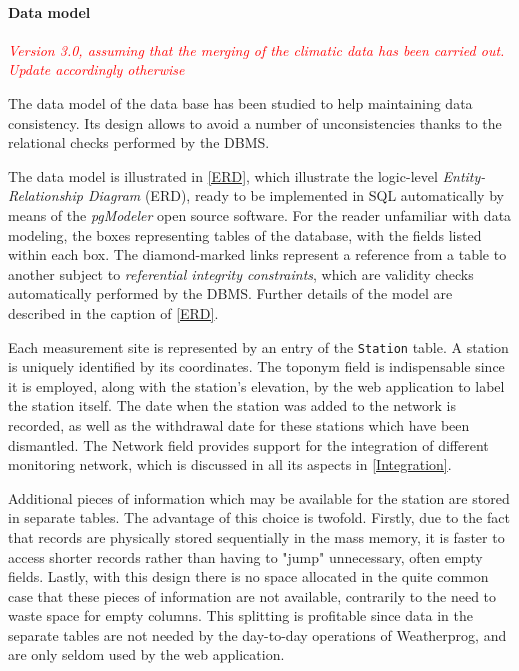\documentclass[authoryear,preprint,review,12pt]{elsarticle}
\newcommand{\note}[1]{\emph{\textcolor{red}{#1}}}
\begin{document}
\paragraph{Data model}
\note{Version 3.0, assuming that the merging of the climatic data has been carried out. Update accordingly otherwise}

The data model of the data base has been studied to help maintaining data consistency. Its design allows to avoid a number of unconsistencies thanks to the relational checks performed by the DBMS. 

The data model is illustrated in  \cref{ERD}, which illustrate the logic-level \emph{Entity-Relationship Diagram} (ERD), ready to be implemented in SQL automatically by means of the \emph{pgModeler} \citep{silva:pgmodeler} open source software. For the reader unfamiliar with data modeling, the boxes representing tables of the database, with the fields listed within each box. The diamond-marked links represent a reference from a table to another subject to \emph{referential integrity constraints}, which are validity checks automatically performed by the DBMS. Further details of the model are described in the caption of \cref{ERD}.

Each measurement site is represented by an entry of the \texttt{Station} table. A station is uniquely identified by its coordinates. The toponym field is indispensable since it is employed, along with the station's elevation, by the web application to label the station itself. The date when the station was added to the network is recorded, as well as the withdrawal date for these stations which have been dismantled. The Network field provides support for the integration of different monitoring network, which is discussed in all its aspects in \cref{Integration}.

Additional pieces of information which may be available for the station are stored in separate tables. The advantage of this choice is twofold. Firstly, due to the fact that records are physically stored sequentially in the mass memory,  it is faster to access shorter records rather than having to "jump" unnecessary, often empty fields. Lastly, with this design there is no space allocated in the quite common case that these pieces of information are not available, contrarily to the need to waste space for empty columns. This splitting is profitable since data in the separate tables are not needed by the day-to-day operations of Weatherprog, and are only seldom used by the web application.
\end{document}
